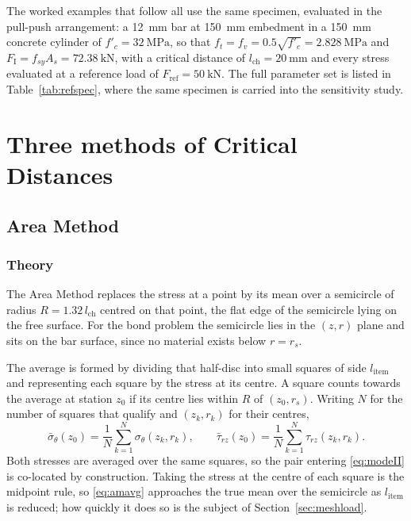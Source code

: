 The worked examples that follow all use the same specimen, evaluated in the
pull-push arrangement: a \SI{12}{\milli\metre} bar at \SI{150}{\milli\metre}
embedment in a \SI{150}{\milli\metre} concrete cylinder of
$f'_c = \SI{32}{\mega\pascal}$, so that
$f_t = f_v = 0.5\sqrt{f'_c} = \SI{2.828}{\mega\pascal}$ and
$F_{\mathrm{I}} = f_{sy}A_s = \SI{72.38}{\kilo\newton}$, with a critical
distance of $l_{\mathrm{ch}} = \SI{20}{\milli\metre}$ and every stress
evaluated at a reference load of $F_{\mathrm{ref}} = \SI{50}{\kilo\newton}$.
The full parameter set is listed in Table~\ref{tab:refspec}, where the same
specimen is carried into the sensitivity study.

\section{Three methods of Critical Distances}
\label{sec:threemethods}

\subsection{Area Method}
\label{sec:areamethod}
 
\subsubsection*{Theory}
 
The Area Method replaces the stress at a point by its mean over a semicircle
of radius $R = 1.32\,l_{\mathrm{ch}}$ centred on that point, the flat edge of
the semicircle lying on the free surface. For the bond problem the semicircle
lies in the $(z, r)$ plane and sits on the bar surface, since no material
exists below $r = r_s$.
 
The average is formed by dividing that half-disc into small squares of side
$l_{\mathrm{item}}$ and representing each square by the stress at its centre.
A square counts towards the average at station $z_0$ if its centre lies
within $R$ of $(z_0, r_s)$. Writing $N$ for the number of squares that
qualify and $(z_k, r_k)$ for their centres,
\begin{equation}
\label{eq:amavg}
\bar{\sigma}_\theta(z_0) = \frac{1}{N} \sum_{k=1}^{N} \sigma_\theta(z_k, r_k),
\qquad
\bar{\tau}_{rz}(z_0) = \frac{1}{N} \sum_{k=1}^{N} \tau_{rz}(z_k, r_k).
\end{equation}
Both stresses are averaged over the same squares, so the pair entering
\eqref{eq:modeII} is co-located by construction. Taking the stress at the
centre of each square is the midpoint rule, so \eqref{eq:amavg} approaches
the true mean over the semicircle as $l_{\mathrm{item}}$ is reduced; how
quickly it does so is the subject of Section~\ref{sec:meshload}.
 
